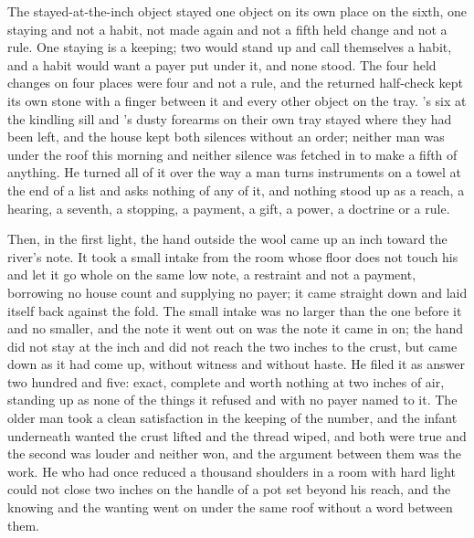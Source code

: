 The stayed-at-the-inch object stayed one object on its own place on the sixth, one staying and not a habit, not made again and not a fifth held change and not a rule. One staying is a keeping; two would stand up and call themselves a habit, and a habit would want a payer put under it, and none stood. The four held changes on four places were four and not a rule, and the returned half-check kept its own stone with a finger between it and every other object on the tray. 's six at the kindling sill and 's dusty forearms on their own tray stayed where they had been left, and the house kept both silences without an order; neither man was under the roof this morning and neither silence was fetched in to make a fifth of anything. He turned all of it over the way a man turns instruments on a towel at the end of a list and asks nothing of any of it, and nothing stood up as a reach, a hearing, a seventh, a stopping, a payment, a gift, a power, a doctrine or a rule.

Then, in the first light, the hand outside the wool came up an inch toward the river's note. It took a small intake from the room whose floor does not touch his and let it go whole on the same low note, a restraint and not a payment, borrowing no house count and supplying no payer; it came straight down and laid itself back against the fold. The small intake was no larger than the one before it and no smaller, and the note it went out on was the note it came in on; the hand did not stay at the inch and did not reach the two inches to the crust, but came down as it had come up, without witness and without haste. He filed it as answer two hundred and five: exact, complete and worth nothing at two inches of air, standing up as none of the things it refused and with no payer named to it. The older man took a clean satisfaction in the keeping of the number, and the infant underneath wanted the crust lifted and the thread wiped, and both were true and the second was louder and neither won, and the argument between them was the work. He who had once reduced a thousand shoulders in a room with hard light could not close two inches on the handle of a pot set beyond his reach, and the knowing and the wanting went on under the same roof without a word between them.

